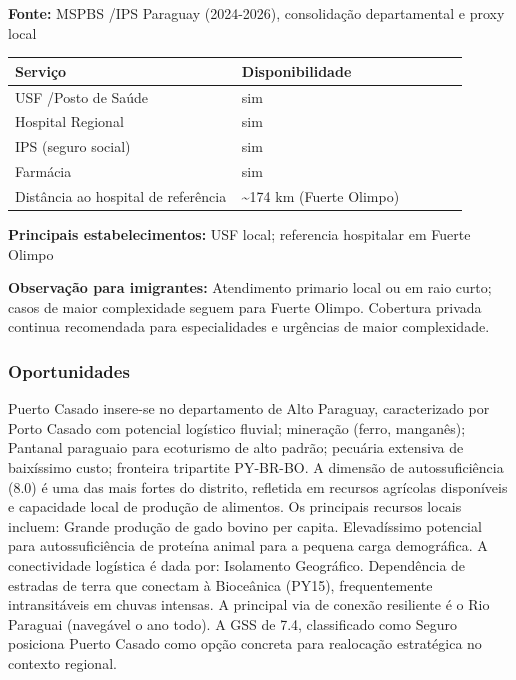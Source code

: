 \textbf{Fonte:} MSPBS /\allowbreak  IPS Paraguay (2024-2026), consolidação
departamental e proxy local

{\def\LTcaptype{none} %
\begin{longtable}{@{}>{\raggedright\arraybackslash}p{0.45\linewidth} >{\raggedright\arraybackslash}p{0.45\linewidth}@{}}
\toprule\noalign{}
Serviço & Disponibilidade \\
\midrule\noalign{}
\endhead
\bottomrule\noalign{}
\endlastfoot
USF /\allowbreak  Posto de Saúde & sim \\
Hospital Regional & sim \\
IPS (seguro social) & sim \\
Farmácia & sim \\
Distância ao hospital de referência & \textasciitilde174 km (Fuerte
Olimpo) \\
\end{longtable}
}

\textbf{Principais estabelecimentos:} USF local; referencia hospitalar
em Fuerte Olimpo

\textbf{Observação para imigrantes:} Atendimento primario local ou em
raio curto; casos de maior complexidade seguem para Fuerte Olimpo.
Cobertura privada continua recomendada para especialidades e urgências
de maior complexidade.

\subsubsection*{Oportunidades}\label{oport-puerto-casado-1702}
Puerto Casado insere-se no departamento de Alto Paraguay, caracterizado por Porto Casado com potencial logístico fluvial; mineração (ferro, manganês); Pantanal paraguaio para ecoturismo de alto padrão; pecuária extensiva de baixíssimo custo; fronteira tripartite PY-BR-BO. A dimensão de autossuficiência (8.0) é uma das mais fortes do distrito, refletida em recursos agrícolas disponíveis e capacidade local de produção de alimentos. Os principais recursos locais incluem: Grande produção de gado bovino per capita. Elevadíssimo potencial para autossuficiência de proteína animal para a pequena carga demográfica. A conectividade logística é dada por: Isolamento Geográfico. Dependência de estradas de terra que conectam à Bioceânica (PY15), frequentemente intransitáveis em chuvas intensas. A principal via de conexão resiliente é o Rio Paraguai (navegável o ano todo). A GSS de 7.4, classificado como Seguro posiciona Puerto Casado como opção concreta para realocação estratégica no contexto regional.

